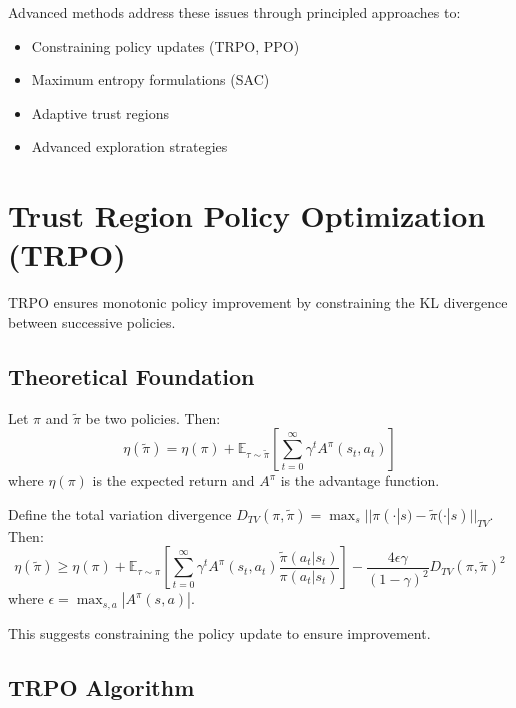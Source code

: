Advanced methods address these issues through principled approaches to:
\begin{itemize}
    \item Constraining policy updates (TRPO, PPO)
    \item Maximum entropy formulations (SAC)
    \item Adaptive trust regions
    \item Advanced exploration strategies
\end{itemize}

\section{Trust Region Policy Optimization (TRPO)}

TRPO ensures monotonic policy improvement by constraining the KL divergence between successive policies.

\subsection{Theoretical Foundation}

\begin{theorem}
Let $\pi$ and $\tilde{\pi}$ be two policies. Then:
\begin{equation}
\eta(\tilde{\pi}) = \eta(\pi) + \mathbb{E}_{\tau \sim \tilde{\pi}} \left[ \sum_{t=0}^\infty \gamma^t A^\pi(s_t, a_t) \right]
\end{equation}
where $\eta(\pi)$ is the expected return and $A^\pi$ is the advantage function.
\end{theorem}

\begin{theorem}
Define the total variation divergence $D_{TV}(\pi, \tilde{\pi}) = \max_s ||\pi(\cdot|s) - \tilde{\pi}(\cdot|s)||_{TV}$. Then:
\begin{equation}
\eta(\tilde{\pi}) \geq \eta(\pi) + \mathbb{E}_{\tau \sim \pi} \left[ \sum_{t=0}^\infty \gamma^t A^\pi(s_t, a_t) \frac{\tilde{\pi}(a_t|s_t)}{\pi(a_t|s_t)} \right] - \frac{4\epsilon \gamma}{(1-\gamma)^2} D_{TV}(\pi, \tilde{\pi})^2
\end{equation}
where $\epsilon = \max_{s,a} |A^\pi(s,a)|$.
\end{theorem}

This suggests constraining the policy update to ensure improvement.

\subsection{TRPO Algorithm}


